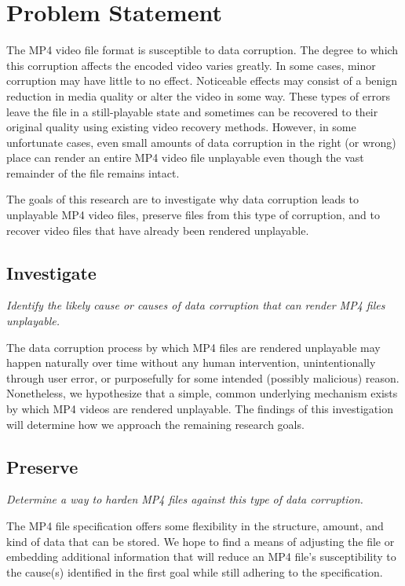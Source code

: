 \section{Problem Statement}

The MP4 video file format is susceptible to data corruption. The degree to which this corruption affects the encoded video varies greatly. In some cases, minor corruption may have little to no effect. Noticeable effects may consist of a benign reduction in media quality or alter the video in some way. These types of errors leave the file in a still-playable state and sometimes can be recovered to their original quality using existing video recovery methods. However, in some unfortunate cases, even small amounts of data corruption in the right (or wrong) place can render an entire MP4 video file unplayable even though the vast remainder of the file remains intact.

The goals of this research are to investigate why data corruption leads to unplayable MP4 video files, preserve files from this type of corruption, and to recover video files that have already been rendered unplayable.

\subsection{Investigate}

\emph{Identify the likely cause or causes of data corruption that can render MP4 files unplayable.}

The data corruption process by which MP4 files are rendered unplayable may happen naturally over time without any human intervention, unintentionally through user error, or purposefully for some intended (possibly malicious) reason. Nonetheless, we hypothesize that a simple, common underlying mechanism exists by which MP4 videos are rendered unplayable. The findings of this investigation will determine how we approach the remaining research goals.

\subsection{Preserve}

\emph{Determine a way to harden MP4 files against this type of data corruption.}

The MP4 file specification offers some flexibility in the structure, amount, and kind of data that can be stored. We hope to find a means of adjusting the file or embedding additional information that will reduce an MP4 file's susceptibility to the cause(s) identified in the first goal while still adhering to the specification.

